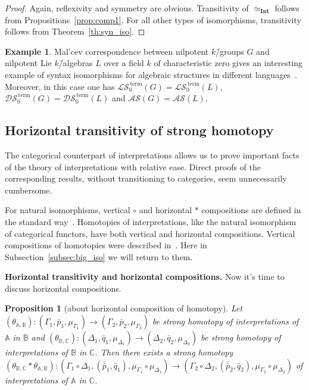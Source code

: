 \documentclass[12pt]{article}
\newtheorem{proposition}{Proposition}
\theoremstyle{definition}
\newtheorem{example}{Example}
\def\MA{{\mathbb{A}}}
\def\MB{{\mathbb{B}}}
\def\MC{{\mathbb{C}}}
\def\Int{{\mathbf{Int}}}
\def\DS{{\mathcal{DS}}}
\def\LS{{\mathcal{LS}}}
\def\AS{{\mathcal{AS}}}
\def\term{{\,\mathrm{term}}}
\begin{document}
\begin{proof}
Again, reflexivity and symmetry are obvious. Transitivity of $\simeq_\Int$ follows from Propositions~\ref{prop:comp1}. For all other types of isomorphisms, transitivity follows from Theorem~\ref{th:syn_iso}.
\end{proof}

\begin{example}
Mal'cev correspondence between nilpotent $k$\=/groups $G$ and nilpotent Lie $k$\=/algebras $L$ over a field $k$ of characteristic zero gives an interesting example of syntax isomorphisms for algebraic structures in different languages~\cite{ABM}. Moreover, in this case one has $\LS^\term_0(G)=\LS^\term_0(L)$, $\DS^\term_0(G)=\DS^\term_0(L)$ and $\AS(G)=\AS(L)$.
\end{example}

\subsection{Horizontal transitivity of strong homotopy}\label{subsec:horiz}

The categorical counterpart of interpretations allows us to prove important facts of the theory of interpretations with relative ease. Direct proofs of the corresponding results, without transitioning to categories, seem unnecessarily cumbersome.

For natural isomorphisms, vertical $\circ$ and horizontal $\ast$ compositions are defined in the standard way~\cite[\S\,II.4, 5]{MacLane}. Homotopies of interpretations, like the natural isomorphism of categorical functors, have both vertical and horizontal compositions. Vertical compositions of homotopies were described in~\cite[Lemma~5]{Th_int1}. Here in Subsection~\ref{subsec:big_iso} we will return to them.

{\bf Horizontal transitivity and horizontal compositions.} 
Now it's time to discuss horizontal compositions.

\begin{proposition}[about horizontal composition of homotopy]\label{prop1:par}
Let $(\theta_{\MA,\MB})\colon (\Gamma_1,\bar p_1,\mu_{\Gamma_1}) \to (\Gamma_2,\bar p_2,\mu_{\Gamma_2})$ be strong homotopy of interpretations of $\MA$ in $\MB$ and $(\theta_{\MB,\MC})\colon (\Delta_1,\bar q_1,\mu_{\Delta_1})\to (\Delta_2,\bar q_2,\mu_{\Delta_2})$ be strong homotopy of interpretations of $\MB$ in $\MC$. Then there exists a strong homotopy $(\theta_{\MB,\MC}\ast\theta_{\MA,\MB})\colon (\Gamma_1\circ\Delta_1,(\bar{\bar p}_1,\bar q_1),\mu_{\Gamma_1}\circ\mu_{\Delta_1})\to(\Gamma_2\circ\Delta_2,(\bar{\bar p}_2,\bar q_2),\mu_{\Gamma_2}\circ\mu_{\Delta_2})$ of interpretations of $\MA$ in $\MC$. 
\end{proposition}
\end{document}
